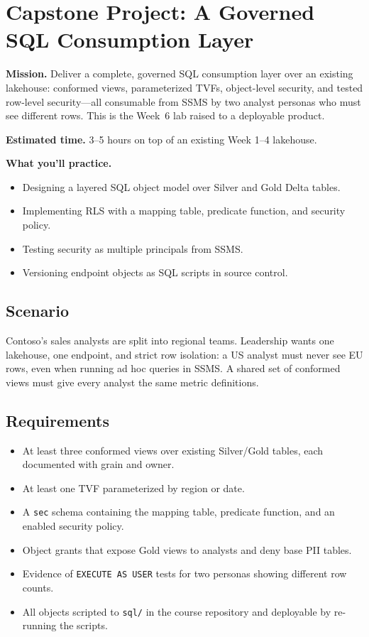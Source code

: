 \section{Capstone Project: A Governed SQL Consumption Layer}\label{sec:ch6-capstone}

\begin{capstonebox}
\textbf{Mission.} Deliver a complete, governed SQL consumption layer over an existing lakehouse: conformed views, parameterized TVFs, object-level security, and tested row-level security---all consumable from SSMS by two analyst personas who must see different rows. This is the Week~6 lab raised to a deployable product.

\textbf{Estimated time.} 3--5 hours on top of an existing Week 1--4 lakehouse.

\textbf{What you'll practice.}
\begin{itemize}
    \item Designing a layered SQL object model over Silver and Gold Delta tables.
    \item Implementing RLS with a mapping table, predicate function, and security policy.
    \item Testing security as multiple principals from SSMS.
    \item Versioning endpoint objects as SQL scripts in source control.
\end{itemize}
\end{capstonebox}

\subsection*{Scenario}
Contoso's sales analysts are split into regional teams. Leadership wants one lakehouse, one endpoint, and strict row isolation: a US analyst must never see EU rows, even when running ad hoc queries in SSMS. A shared set of conformed views must give every analyst the same metric definitions.

\subsection*{Requirements}
\begin{itemize}
    \item At least three conformed views over existing Silver/Gold tables, each documented with grain and owner.
    \item At least one TVF parameterized by region or date.
    \item A \texttt{sec} schema containing the mapping table, predicate function, and an enabled security policy.
    \item Object grants that expose Gold views to analysts and deny base PII tables.
    \item Evidence of \texttt{EXECUTE AS USER} tests for two personas showing different row counts.
    \item All objects scripted to \texttt{sql/} in the course repository and deployable by re-running the scripts.
\end{itemize}

